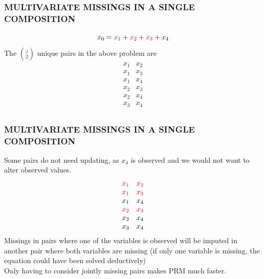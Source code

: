 \documentclass[aspectratio=169]{beamer} %
\begin{document}
\begin{frame}
  \frametitle{MULTIVARIATE MISSINGS IN A SINGLE COMPOSITION}
\begin{equation*}
\label{top}
x_0=\textcolor{red}{x_1}+\textcolor{red}{x_2}+\textcolor{red}{x_3}+x_4
\end{equation*}
The ${j \choose 2}$ unique pairs in the above problem are
\begin{equation*}
\begin{array}{cc}
x_1 &x_2\\
x_1 &x_3\\
x_1 &x_4\\
x_2 &x_3\\
x_2 &x_4\\
x_3 &x_4\\
\end{array}
\end{equation*}
\end{frame}

\begin{frame}
  \frametitle{MULTIVARIATE MISSINGS IN A SINGLE COMPOSITION}
Some pairs do not need updating, as $x_4$ is observed and we would not want to alter observed values. 
\begin{equation*}
\begin{array}{cc}
\textcolor{red}{x_1} &\textcolor{red}{x_2}\\
\textcolor{red}{x_1} &\textcolor{red}{x_3}\\
x_1 &x_4\\
\textcolor{red}{x_2} &\textcolor{red}{x_3}\\
x_2 &x_4\\
x_3 &x_4\\
\end{array}
\end{equation*}
Missings in pairs where one of the variables is observed will be imputed in another pair where both variables are missing (if only one variable is missing, the equation could have been solved deductively)
\newline \\
Only having to consider jointly missing pairs makes PRM much faster. 
\end{frame}
\end{document}
